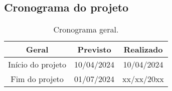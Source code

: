 \begin{landscape}

\chapter{Cronograma do projeto}

\begin{table}[htpb]
\begin{center}
\caption{Cronograma geral.}
\begin{tabular}{|c|c|c|}
\hline
\textbf{Geral}          & \textbf{Previsto} & \textbf{Realizado} \\ \hline
Início do projeto       & 10/04/2024        & 10/04/2024         \\ \hline
Fim do projeto          & 01/07/2024        & xx/xx/20xx         \\ \hline
\end{tabular}
\end{center}
\end{table}


\end{landscape}
